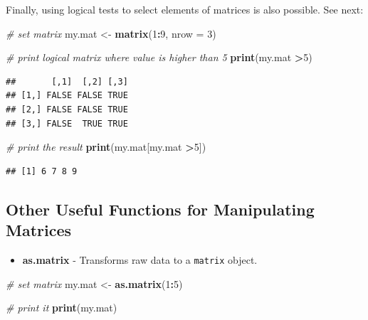 \documentclass[11pt,]{book}
\newenvironment{Shaded}{\begin{snugshade}}{\end{snugshade}}
\newcommand{\KeywordTok}[1]{\textcolor[rgb]{0.27,0.27,0.27}{\textbf{#1}}}
\newcommand{\DataTypeTok}[1]{\textcolor[rgb]{0.27,0.27,0.27}{#1}}
\newcommand{\DecValTok}[1]{\textcolor[rgb]{0.06,0.06,0.06}{#1}}
\newcommand{\StringTok}[1]{\textcolor[rgb]{0.5,0.5,0.5}{#1}}
\newcommand{\CommentTok}[1]{\textcolor[rgb]{0.56,0.35,0.01}{\textit{#1}}}
\newcommand{\OperatorTok}[1]{\textcolor[rgb]{0.81,0.36,0.00}{\textbf{#1}}}
\newcommand{\NormalTok}[1]{#1}
\providecommand{\tightlist}{%
  \setlength{\itemsep}{0pt}\setlength{\parskip}{0pt}}
\begin{document}
Finally, using logical tests to select elements of matrices is also
possible. See next: 

\begin{Shaded}
\begin{Highlighting}[]
\CommentTok{# set matrix}
\NormalTok{my.mat <-}\StringTok{ }\KeywordTok{matrix}\NormalTok{(}\DecValTok{1}\OperatorTok{:}\DecValTok{9}\NormalTok{, }\DataTypeTok{nrow =} \DecValTok{3}\NormalTok{)}

\CommentTok{# print logical matrix where value is higher than 5}
\KeywordTok{print}\NormalTok{(my.mat }\OperatorTok{>}\DecValTok{5}\NormalTok{)}
\end{Highlighting}
\end{Shaded}

\begin{verbatim}
##       [,1]  [,2] [,3]
## [1,] FALSE FALSE TRUE
## [2,] FALSE FALSE TRUE
## [3,] FALSE  TRUE TRUE
\end{verbatim}

\begin{Shaded}
\begin{Highlighting}[]
\CommentTok{# print the result}
\KeywordTok{print}\NormalTok{(my.mat[my.mat }\OperatorTok{>}\DecValTok{5}\NormalTok{])}
\end{Highlighting}
\end{Shaded}

\begin{verbatim}
## [1] 6 7 8 9
\end{verbatim}

\subsection{Other Useful Functions for Manipulating
Matrices}\label{other-useful-functions-for-manipulating-matrices}

\begin{itemize}
\tightlist
\item
  \textbf{as.matrix} - Transforms raw data to a \texttt{matrix} object.
\end{itemize}

\begin{Shaded}
\begin{Highlighting}[]
\CommentTok{# set matrix}
\NormalTok{my.mat <-}\StringTok{ }\KeywordTok{as.matrix}\NormalTok{(}\DecValTok{1}\OperatorTok{:}\DecValTok{5}\NormalTok{)}

\CommentTok{# print it}
\KeywordTok{print}\NormalTok{(my.mat)}
\end{Highlighting}
\end{Shaded}
\end{document}
